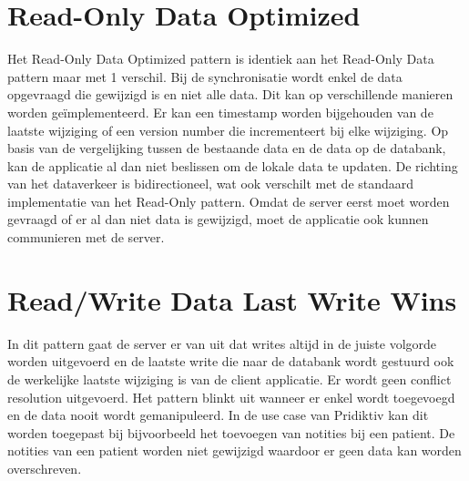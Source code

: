 \section{Read-Only Data Optimized}
Het Read-Only Data Optimized pattern is identiek aan het Read-Only Data pattern maar met 1 verschil. Bij de synchronisatie wordt enkel de data opgevraagd die gewijzigd is en niet alle data. Dit kan op verschillende manieren worden ge\"implementeerd. Er kan een timestamp worden bijgehouden van de laatste wijziging of een version number die incrementeert bij elke wijziging. Op basis van de vergelijking tussen de bestaande data en de data op de databank, kan de applicatie al dan niet beslissen om de lokale data te updaten. De richting van het dataverkeer is bidirectioneel, wat ook verschilt met de standaard implementatie van het Read-Only pattern. Omdat de server eerst moet worden gevraagd of er al dan niet data is gewijzigd, moet de applicatie ook kunnen communieren met de server.
\section{Read/Write Data Last Write Wins}
In dit pattern gaat de server er van uit dat writes altijd in de juiste volgorde worden uitgevoerd en de laatste write die naar de databank wordt gestuurd ook de werkelijke laatste wijziging is van de client applicatie. Er wordt geen conflict resolution uitgevoerd. Het pattern blinkt uit wanneer er enkel wordt toegevoegd en de data nooit wordt gemanipuleerd. In de use case van Pridiktiv kan dit worden toegepast bij bijvoorbeeld het toevoegen van notities bij een patient. De notities van een patient worden niet gewijzigd waardoor er geen data kan worden overschreven.
